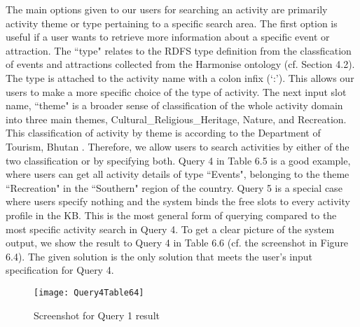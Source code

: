 \hspace{0.3in}The main options given to our users for searching an activity are primarily activity theme or type pertaining to a specific search area. The first option is useful if a user wants to retrieve more information about a specific event or attraction.
The ``type" relates to the RDFS type definition from the classfication of events and attractions collected from the Harmonise ontology (cf. Section 4.2). The type is attached to the activity name with a colon infix (`:'). 
This allows our users to make a more specific choice of the type of activity. The next input slot name, ``theme" is a broader sense of classification of the whole activity domain into three main themes, Cultural\_Religious\_Heritage, Nature, and Recreation. This classification of activity 
by theme is according to the Department of Tourism, Bhutan \cite{MZ:05}. Therefore, we allow users to search activities by either of the two classification or by specifying both. Query 4 in Table 6.5 is a good example, where users can get all activity details of type ``Events", belonging to the theme ``Recreation" in the ``Southern" region of the country. Query 5 is a special case where users specify nothing and the system binds the free slots to every activity profile in the KB. This is the most general form of querying compared to the most specific activity search in Query 4. To get a clear picture of the system output, we show the result to Query 4 in Table 6.6 (cf. the screenshot in Figure 6.4). The given solution is the only solution that meets the user's input specification for Query 4.

\begin{figure}
\begin{center}
\texttt{[image: Query4Table64]}
\caption {Screenshot for Query 1 result}
\label{fig:Fig6.2}
\end{center}
\end{figure}


